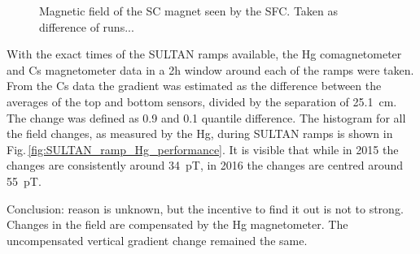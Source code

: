 \begin{figure}
  \centering
  \quad
  \caption{Magnetic field of the SC magnet seen by the SFC. Taken as difference of runs...}
\end{figure}

With the exact times of the SULTAN ramps available, the Hg comagnetometer and Cs magnetometer data in a 2h window around each of the ramps were taken. From the Cs data the gradient was estimated as the difference between the averages of the top and bottom sensors, divided by the separation of \SI{25.1}{\centi\meter}. The change was defined as 0.9 and 0.1 quantile difference. The histogram for all the field changes, as measured by the Hg, during SULTAN ramps is shown in Fig.\,\ref{fig:SULTAN_ramp_Hg_performance}. It is visible that while in 2015 the changes are consistently around \SI{34}{\pico\tesla}, in 2016 the changes are centred around \SI{55}{\pico\tesla}.



Conclusion: reason is unknown, but the incentive to find it out is not to strong. Changes in the field are compensated by the Hg magnetometer. The uncompensated vertical gradient change remained the same.






